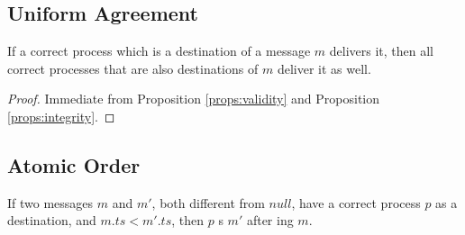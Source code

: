 \documentclass[times, 10pt]{article}
\begin{document}
\subsection{Uniform Agreement}

\begin{props} \label{props:agreement}
If a correct process which is a destination of a message $m$ delivers it, then all correct processes that are also destinations of $m$ deliver it as well.
\end{props}

\begin{proof}
Immediate from Proposition \ref{props:validity} and Proposition \ref{props:integrity}.
\end{proof}






\subsection{Atomic Order}






\begin{lems} \label{lemma:respecttimestamps}
If two messages $m$ and $m'$, both different from $null$, have a correct process $p$ as a destination, and $m.ts < m'.ts$, then $p$ \amdel{}s $m'$ after \amdel{}ing $m$.
\end{lems}
\end{document}
